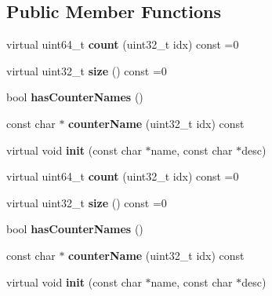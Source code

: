 \subsection*{Public Member Functions}
\begin{DoxyCompactItemize}
\item 
\hypertarget{classVectorStat_ae1a1af87b8ace368f942bb696d0b66f3}{virtual uint64\-\_\-t {\bfseries count} (uint32\-\_\-t idx) const =0}\label{classVectorStat_ae1a1af87b8ace368f942bb696d0b66f3}

\item 
\hypertarget{classVectorStat_a507888e5f767a333fd8e0ed124bd2805}{virtual uint32\-\_\-t {\bfseries size} () const =0}\label{classVectorStat_a507888e5f767a333fd8e0ed124bd2805}

\item 
\hypertarget{classVectorStat_a8ac8964feb39c3812e95081f90f7254c}{bool {\bfseries has\-Counter\-Names} ()}\label{classVectorStat_a8ac8964feb39c3812e95081f90f7254c}

\item 
\hypertarget{classVectorStat_abd0dcde7ab45ec09010f8b22655f54f8}{const char $\ast$ {\bfseries counter\-Name} (uint32\-\_\-t idx) const }\label{classVectorStat_abd0dcde7ab45ec09010f8b22655f54f8}

\item 
\hypertarget{classVectorStat_a2987ee17f0f91ef3bf4182bf304fa6f8}{virtual void {\bfseries init} (const char $\ast$name, const char $\ast$desc)}\label{classVectorStat_a2987ee17f0f91ef3bf4182bf304fa6f8}

\item 
\hypertarget{classVectorStat_ae1a1af87b8ace368f942bb696d0b66f3}{virtual uint64\-\_\-t {\bfseries count} (uint32\-\_\-t idx) const =0}\label{classVectorStat_ae1a1af87b8ace368f942bb696d0b66f3}

\item 
\hypertarget{classVectorStat_a507888e5f767a333fd8e0ed124bd2805}{virtual uint32\-\_\-t {\bfseries size} () const =0}\label{classVectorStat_a507888e5f767a333fd8e0ed124bd2805}

\item 
\hypertarget{classVectorStat_a8ac8964feb39c3812e95081f90f7254c}{bool {\bfseries has\-Counter\-Names} ()}\label{classVectorStat_a8ac8964feb39c3812e95081f90f7254c}

\item 
\hypertarget{classVectorStat_abd0dcde7ab45ec09010f8b22655f54f8}{const char $\ast$ {\bfseries counter\-Name} (uint32\-\_\-t idx) const }\label{classVectorStat_abd0dcde7ab45ec09010f8b22655f54f8}

\item 
\hypertarget{classVectorStat_a2987ee17f0f91ef3bf4182bf304fa6f8}{virtual void {\bfseries init} (const char $\ast$name, const char $\ast$desc)}\label{classVectorStat_a2987ee17f0f91ef3bf4182bf304fa6f8}

\end{DoxyCompactItemize}
